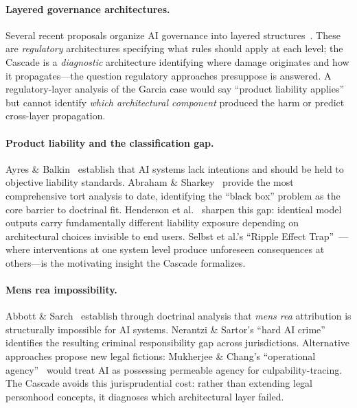 \documentclass[11pt]{article}
\begin{document}
\paragraph{Layered governance architectures.} Several recent proposals organize AI governance into layered structures~\cite{bommarito2025governing}. These are \textit{regulatory} architectures specifying what rules should apply at each level; the Cascade is a \textit{diagnostic} architecture identifying where damage originates and how it propagates---the question regulatory approaches presuppose is answered. A regulatory-layer analysis of the Garcia case would say ``product liability applies'' but cannot identify \textit{which architectural component} produced the harm or predict cross-layer propagation.

\paragraph{Product liability and the classification gap.} Ayres \& Balkin~\cite{ayres2024risky} establish that AI systems lack intentions and should be held to objective liability standards. Abraham \& Sharkey~\cite{abraham2026untangling} provide the most comprehensive tort analysis to date, identifying the ``black box'' problem as the core barrier to doctrinal fit. Henderson et al.~\cite{henderson2023liability} sharpen this gap: identical model outputs carry fundamentally different liability exposure depending on architectural choices invisible to end users. Selbst et al.'s ``Ripple Effect Trap''~\cite{selbst2019fairness}---where interventions at one system level produce unforeseen consequences at others---is the motivating insight the Cascade formalizes.

\paragraph{Mens rea impossibility.} Abbott \& Sarch~\cite{abbott2020punishing} establish through doctrinal analysis that \textit{mens rea} attribution is structurally impossible for AI systems. Nerantzi \& Sartor's ``hard AI crime''~\cite{nerantzi2024hardai} identifies the resulting criminal responsibility gap across jurisdictions. Alternative approaches propose new legal fictions: Mukherjee \& Chang's ``operational agency''~\cite{mukherjee2026operational} would treat AI as possessing permeable agency for culpability-tracing. The Cascade avoids this jurisprudential cost: rather than extending legal personhood concepts, it diagnoses which architectural layer failed.
\end{document}
